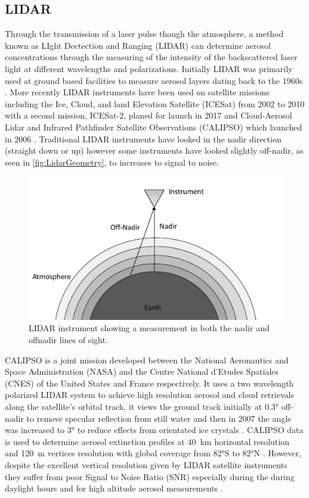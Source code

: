 \subsection{LIDAR}

Through the transmission of a laser pulse though the atmosphere, a method known as LIght Dectection and Ranging (LIDAR) can determine aerosol concentrations through the measuring of the intensity of the backscattered laser light at different wavelengths and polarizations. Initially LIDAR was primarily used at ground based facilities to measure aerosol layers dating back to the 1960s \citep{Fiocco1964}. More recently LIDAR instruments have been used on satellite missions including the Ice, Cloud, and land Elevation Satellite (ICESat) from 2002 to 2010 \citep{Schutz2005} with a second mission, ICESat-2, planed for launch in 2017 and Cloud-Aerosol Lidar and Infrared Pathfinder Satellite Observations (CALIPSO) which launched in 2006 \citep{Winker2007}. Traditional LIDAR instruments have looked in the nadir direction (straight down or up) however some instruments have looked slightly off-nadir, as seen in \autoref{fig:LidarGeometry}, to increases to signal to noise.

\begin{figure}[h]
    \includegraphics[width=1.0\textwidth]{./Images/LidarGeometry.pdf}
    \caption[LIDAR Geometry]{LIDAR instrument showing a measurement in both the nadir and offnadir lines of sight.}
    \label{fig:LidarGeometry}
\end{figure}

CALIPSO is a joint mission developed between the National Aeronautics and Space Administration (NASA) and the Centre National d'Etudes Spatiales (CNES) of the United States and France respectively. It uses a two wavelength polarized LIDAR system to achieve high resolution aerosol and cloud retrievals along the satellite's orbital track, it views the ground track initially at 0.3\si{\degree} off-nadir to remove specular reflection from still water and then in 2007 the angle was increased to 3\si{\degree} to reduce effects from orientated ice crystals \citep{Hu2009}. CALIPSO data is used to determine aerosol extinction profiles at 40~km horizontal resolution and 120~m vertices resolution with global coverage from 82\si{\degree}S to 82\si{\degree}N \citep{Young2009}. However, despite the excellent vertical resolution given by LIDAR satellite instruments they suffer from poor Signal to Noise Ratio (SNR) especially during the during daylight hours and for high altitude aerosol measurements \citep{Kacenelenbogen2011}.


